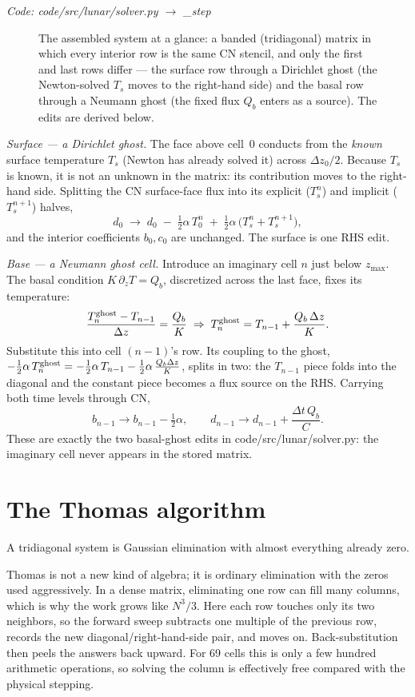 \documentclass[11pt]{report}
\newcommand{\code}[1]{{\ttfamily\small #1}}
\begin{document}
{\small\color{dim}\textit{Code: \code{code/src/lunar/solver.py} $\to$ \code{\_step}}}

\begin{figure}[htbp]\centering

\caption{The assembled system at a glance: a banded (tridiagonal) matrix in
which every interior row is the same CN stencil, and only the first and last
rows differ --- the surface row through a Dirichlet ghost (the Newton-solved
$T_s$ moves to the right-hand side) and the basal row through a Neumann ghost
(the fixed flux $Q_b$ enters as a source). The edits are derived below.}
\label{fig:trimatrix}
\end{figure}

\emph{Surface --- a Dirichlet ghost.} The face above cell~0 conducts from the
\emph{known} surface temperature $T_s$ (Newton has already solved it) across
$\Delta z_0/2$. Because $T_s$ is known, it is not an unknown in the matrix: its
contribution moves to the right-hand side. Splitting the CN surface-face flux
into its explicit ($T_s^n$) and implicit ($T_s^{n+1}$) halves,
\[
d_0 \;\to\; d_0 \;-\;\tfrac12\alpha\,T_0^{n}
\;+\;\tfrac12\alpha\,\big(T_s^{n}+T_s^{n+1}\big),
\]
and the interior coefficients $b_0,c_0$ are unchanged. The surface is one RHS
edit.

\emph{Base --- a Neumann ghost cell.} Introduce an imaginary cell $n$ just below
$z_{\max}$. The basal condition $K\,\partial_z T=Q_b$, discretized across the last
face, fixes its temperature:
\[
\frac{T_n^{\rm ghost}-T_{n-1}}{\Delta z}=\frac{Q_b}{K}
\;\Rightarrow\;
T_n^{\rm ghost}=T_{n-1}+\frac{Q_b\,\Delta z}{K}.
\]
Substitute this into cell $(n{-}1)$'s row. Its coupling to the ghost,
$-\tfrac12\alpha\,T_n^{\rm ghost}=-\tfrac12\alpha\,T_{n-1}-\tfrac12\alpha\,
\tfrac{Q_b\Delta z}{K}$, splits in two: the $T_{n-1}$ piece folds into the
diagonal and the constant piece becomes a flux source on the RHS. Carrying both
time levels through CN,
\[
\boxed{\;b_{n-1}\to b_{n-1}-\tfrac12\alpha,\qquad
d_{n-1}\to d_{n-1}+\frac{\Delta t\,Q_b}{C}.\;}
\]
These are exactly the two basal-ghost edits in \code{code/src/lunar/solver.py}:
the imaginary cell never appears in the stored matrix.

\section{The Thomas algorithm}\label{app:thomas}
A tridiagonal system is Gaussian elimination with almost everything already zero.

\begin{plain}
Thomas is not a new kind of algebra; it is ordinary elimination with the zeros
used aggressively. In a dense matrix, eliminating one row can fill many columns,
which is why the work grows like $N^3/3$. Here each row touches only its two
neighbors, so the forward sweep subtracts one multiple of the previous row,
records the new diagonal/right-hand-side pair, and moves on. Back-substitution
then peels the answers back upward. For 69 cells this is only a few hundred
arithmetic operations, so solving the column is effectively free compared with
the physical stepping.
\end{plain}
\end{document}
